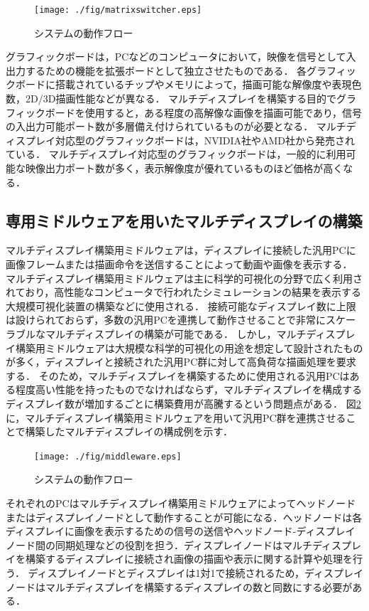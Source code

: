 \begin{figure}[htbp]
 \texttt{[image: ./fig/matrixswitcher.eps]}
 \caption{システムの動作フロー}
 \label{fig_2.1}
\end{figure}

グラフィックボードは，PCなどのコンピュータにおいて，映像を信号として入出力するための機能を拡張ボードとして独立させたものである．
各グラフィックボードに搭載されているチップやメモリによって，描画可能な解像度や表現色数，2D/3D描画性能などが異なる．
マルチディスプレイを構築する目的でグラフィックボードを使用すると，ある程度の高解像な画像を描画可能であり，信号の入出力可能ポート数が多層備え付けられているものが必要となる．
マルチディスプレイ対応型のグラフィックボードは，NVIDIA社やAMD社から発売されている．
マルチディスプレイ対応型のグラフィックボードは，一般的に利用可能な映像出力ポート数が多く，表示解像度が優れているものほど価格が高くなる．

\subsection*{専用ミドルウェアを用いたマルチディスプレイの構築}

マルチディスプレイ構築用ミドルウェアは，ディスプレイに接続した汎用PCに画像フレームまたは描画命令を送信することによって動画や画像を表示する．
マルチディスプレイ構築用ミドルウェアは主に科学的可視化の分野で広く利用されており，高性能なコンピュータで行われたシミュレーションの結果を表示する大規模可視化装置の構築などに使用される．
接続可能なディスプレイ数に上限は設けられておらず，多数の汎用PCを連携して動作させることで非常にスケーラブルなマルチディスプレイの構築が可能である．
しかし，マルチディスプレイ構築用ミドルウェアは大規模な科学的可視化の用途を想定して設計されたものが多く，ディスプレイと接続された汎用PC群に対して高負荷な描画処理を要求する．
そのため，マルチディスプレイを構築するために使用される汎用PCはある程度高い性能を持ったものでなければならず，マルチディスプレイを構成するディスプレイ数が増加するごとに構築費用が高騰するという問題点がある．
図\ref{fig_2.2}に，マルチディスプレイ構築用ミドルウェアを用いて汎用PC群を連携させることで構築したマルチディスプレイの構成例を示す．

\begin{figure}[htbp]
 \texttt{[image: ./fig/middleware.eps]}
 \caption{システムの動作フロー}
 \label{fig_2.2}
\end{figure}

それぞれのPCはマルチディスプレイ構築用ミドルウェアによってヘッドノードまたはディスプレイノードとして動作することが可能になる．ヘッドノードは各ディスプレイに画像を表示するための信号の送信やヘッドノード-ディスプレイノード間の同期処理などの役割を担う．ディスプレイノードはマルチディスプレイを構築するディスプレイに接続され画像の描画や表示に関する計算や処理を行う．
ディスプレイノードとディスプレイは1対1で接続されるため，ディスプレイノードはマルチディスプレイを構築するディスプレイの数と同数にする必要がある．

